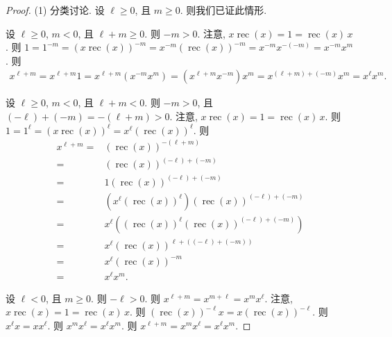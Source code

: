 \documentclass[../libro.tex]{subfiles}
\begin{document}
\begin{proof}
    (1)
    分类讨论.
    设 \(\ell \geq 0\), 且 \(m \geq 0\).
    则我们已证此情形.

    设 \(\ell \geq 0\), \(m < 0\), 且 \(\ell + m \geq 0\).
    则 \(-m > 0\).
    注意,
    \(x \operatorname{rec} {(x)}
    = 1 = \operatorname{rec} {(x)}\, x\).
    则
    \(1 = 1^{-m}
        = (x \operatorname{rec} {(x)})^{-m}
        = x^{-m} (\operatorname{rec} {(x)})^{-m}
        = x^{-m} x^{-(-m)}
    = x^{-m} x^m\).
    则
    \begin{align*}
        x^{\ell + m}
        = x^{\ell + m} 1
        = x^{\ell + m} (x^{-m} x^m)
        = (x^{\ell + m} x^{-m}) x^m
        = x^{(\ell + m) + (-m)} x^m
        = x^\ell x^m.
    \end{align*}

    设 \(\ell \geq 0\), \(m < 0\), 且 \(\ell + m < 0\).
    则 \(-m > 0\), 且
    \((-\ell) + (-m) = -(\ell + m) > 0\).
    注意,
    \(x \operatorname{rec} {(x)}
    = 1 = \operatorname{rec} {(x)}\, x\).
    则
    \(1 = 1^\ell = (x \operatorname{rec} {(x)})^\ell
    = x^\ell (\operatorname{rec} {(x)})^\ell\).
    则
    \begin{align*}
        x^{\ell + m}
        = {} &
        (\operatorname{rec} {(x)})^{-(\ell + m)}
        \\
        = {} &
        (\operatorname{rec} {(x)})^{(-\ell) + (-m)}
        \\
        = {} &
        1 (\operatorname{rec} {(x)})^{(-\ell) + (-m)}
        \\
        = {} &
        (x^\ell (\operatorname{rec} {(x)})^\ell) (\operatorname{rec} {(x)})^{(-\ell) + (-m)}
        \\
        = {} &
        x^\ell ((\operatorname{rec} {(x)})^\ell (\operatorname{rec} {(x)})^{(-\ell) + (-m)})
        \\
        = {} &
        x^\ell (\operatorname{rec} {(x)})^{\ell + ((-\ell) + (-m))}
        \\
        = {} &
        x^\ell (\operatorname{rec} {(x)})^{-m}
        \\
        = {} &
        x^\ell x^m.
    \end{align*}

    设 \(\ell < 0\), 且 \(m \geq 0\).
    则 \(-\ell > 0\).
    则
    \(x^{\ell + m} = x^{m + \ell} = x^m x^\ell\).
    注意,
    \(x \operatorname{rec} {(x)}
    = 1 = \operatorname{rec} {(x)}\, x\).
    则
    \((\operatorname{rec} {(x)})^{-\ell} x
    = x (\operatorname{rec} {(x)})^{-\ell}\).
    则
    \(x^\ell x = x x^\ell\).
    则
    \(x^m x^\ell = x^\ell x^m\).
    则
    \(x^{\ell + m} = x^m x^\ell = x^\ell x^m\).


\end{proof}
\end{document}
